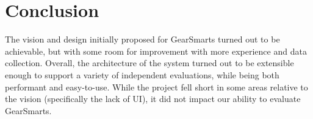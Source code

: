 \section{Conclusion}
\label{section:conclusion}
The vision and design initially proposed for GearSmarts turned out to be achievable, but with some room for improvement
with more experience and data collection. Overall, the architecture of the system turned out to be extensible enough to
support a variety of independent evaluations, while being both performant and easy-to-use. While the project fell short
in some areas relative to the vision (specifically the lack of UI), it did not impact our ability to evaluate GearSmarts.